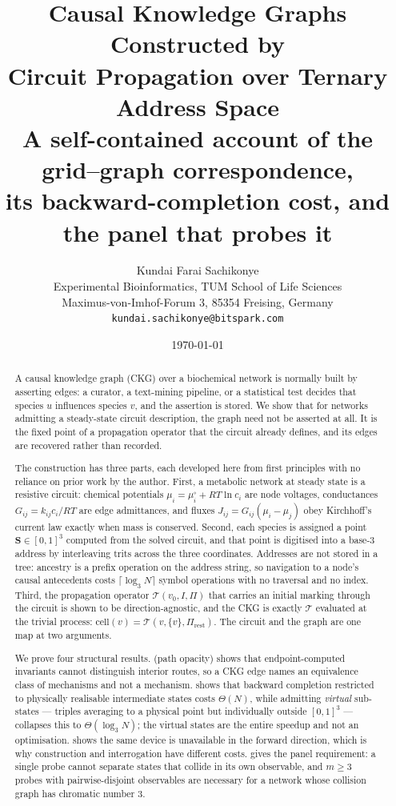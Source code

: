 \documentclass[11pt,twocolumn,a4paper]{article}
\title{\textbf{Causal Knowledge Graphs Constructed by\\
Circuit Propagation over Ternary Address Space}\\[0.4em]
\large A self-contained account of the grid--graph correspondence,\\
its backward-completion cost, and the panel that probes it}
\author{%
Kundai Farai Sachikonye\\[0.3em]
\normalsize Experimental Bioinformatics, TUM School of Life Sciences\\
\normalsize Maximus-von-Imhof-Forum 3, 85354 Freising, Germany\\
\normalsize \texttt{kundai.sachikonye@bitspark.com}}
\date{\today}
\theoremstyle{plain}
\theoremstyle{definition}
\theoremstyle{remark}
\newcommand{\Scoord}{\mathbf{S}}
\newcommand{\Tmap}{\mathcal{T}}
\begin{document}
\maketitle

\begin{abstract}
A causal knowledge graph (CKG) over a biochemical network is normally built by
asserting edges: a curator, a text-mining pipeline, or a statistical test decides
that species $u$ influences species $v$, and the assertion is stored. We show
that for networks admitting a steady-state circuit description, the graph need
not be asserted at all. It is the fixed point of a propagation operator that the
circuit already defines, and its edges are recovered rather than recorded.

The construction has three parts, each developed here from first principles with
no reliance on prior work by the author. First, a metabolic network at
steady state is a resistive circuit: chemical potentials
$\mu_i = \mu_i^\circ + RT\ln c_i$ are node voltages, conductances
$G_{ij} = k_{ij}c_i/RT$ are edge admittances, and fluxes $J_{ij} = G_{ij}(\mu_i-\mu_j)$
obey Kirchhoff's current law exactly when mass is conserved. Second, each species
is assigned a point $\Scoord \in [0,1]^3$ computed from the solved circuit, and
that point is digitised into a base-3 address by interleaving trits across the three
coordinates. Addresses are not stored in a tree: ancestry is a prefix operation on
the address string, so navigation to a node's causal antecedents costs
$\lceil \log_3 N\rceil$ symbol operations with no traversal and no index. Third,
the propagation operator $\Tmap(v_0, I, \Pi)$ that carries an initial marking
through the circuit is shown to be direction-agnostic, and the CKG is exactly
$\Tmap$ evaluated at the trivial process: $\mathrm{cell}(v) = \Tmap(v,\{v\},\Pi_{\mathrm{rest}})$.
The circuit and the graph are one map at two arguments.

We prove four structural results.  (path opacity) shows that
endpoint-computed invariants cannot distinguish interior routes, so a CKG edge
names an equivalence class of mechanisms and not a mechanism.
 shows that backward completion restricted to physically
realisable intermediate states costs $\Theta(N)$, while admitting \emph{virtual}
sub-states --- triples averaging to a physical point but individually
outside $[0,1]^3$ --- collapses this to $\Theta(\log_3 N)$; the virtual
states are the entire speedup and not an optimisation.
 shows the same device is unavailable in the forward
direction, which is why construction and interrogation have different costs.
 gives the panel requirement: a single probe cannot
separate states that collide in its own observable, and $m \ge 3$ probes with
pairwise-disjoint observables are necessary for a network whose collision graph
has chromatic number $3$.


\end{abstract}
\end{document}
